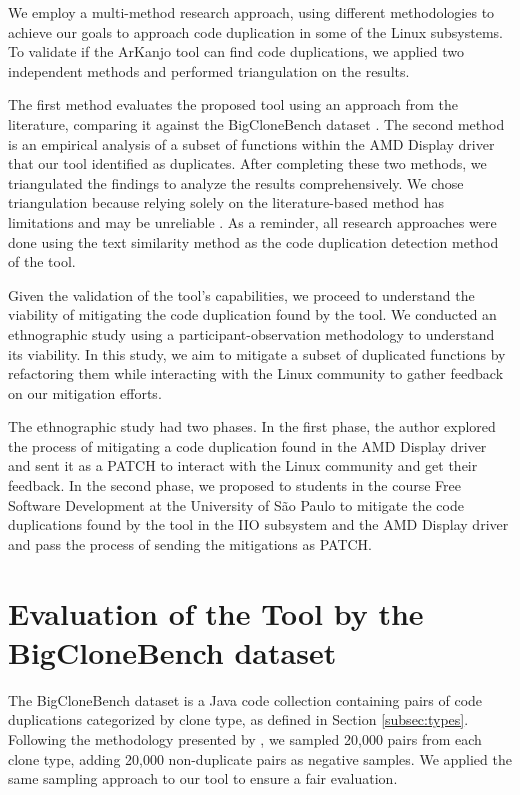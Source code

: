 
We employ a multi-method research approach, using different methodologies to achieve our 
goals to approach code duplication in some of the Linux subsystems. To validate if the 
ArKanjo tool can find code duplications, we applied two independent methods and performed 
triangulation on the results.

The first method evaluates the proposed tool using an approach from the literature, 
comparing it against the BigCloneBench dataset \citep{bigclonebench}. 
The second method is an empirical analysis of a subset of functions within the 
AMD Display driver that our tool identified as duplicates. After completing these two 
methods, we triangulated the findings to analyze the results comprehensively. 
We chose triangulation because relying solely on the literature-based method has 
limitations and may be unreliable \citep{bigfail, litreview}. 
As a reminder, all research approaches were done using the text similarity method 
as the code duplication detection method of the tool.

Given the validation of the tool’s capabilities, we proceed to understand the viability 
of mitigating the code duplication found by the tool. We conducted an ethnographic study 
using a participant-observation methodology to understand its viability. In this study, 
we aim to mitigate a subset of duplicated functions by refactoring them while interacting 
with the Linux community to gather feedback on our mitigation efforts.

The ethnographic study had two phases. In the first phase, the author explored the process 
of mitigating a code duplication found in the AMD Display driver and sent it as a PATCH to 
interact with the Linux community and get their feedback. In the second phase, we proposed 
to students in the course Free Software Development at the University of São Paulo to mitigate 
the code duplications found by the tool in the IIO subsystem and the AMD Display driver and 
pass the process of sending the mitigations as PATCH.

\section{Evaluation of the Tool by the BigCloneBench dataset}

\label{sec:metbig}

The BigCloneBench dataset \citep{bigclonebench} is a Java code collection containing pairs of code duplications categorized by clone type, as defined in Section \ref{subsec:types}.
%
Following the methodology presented by \citep{tailor}, we sampled 20,000 pairs from each clone type, adding 20,000 non-duplicate pairs as negative samples. We applied the same sampling approach to our tool to ensure a fair evaluation.

